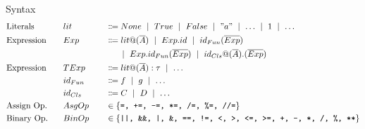 \documentclass[11pt]{jarticle}
\begin{document}
Syntax
\begin{alignat*}{3} %
  &\text{Literals} &&lit &&\Coloneqq None ~\mid~ True ~\mid~ False ~\mid~ "a" ~\mid~ \dots ~\mid~ 1 ~\mid~ \dots\\
  &\text{Expression}~~~ &&Exp &&\Coloneqq lit@(\overline{A}) ~\mid~ Exp.id  ~\mid~ id_{Fun}(\overline{Exp})\\
  &&&&&~~~~~\mid~ Exp.id_{Fun}(\overline{Exp}) ~\mid~ id_{Cls}@(\overline{A}).(\overline{Exp})\\
  &\text{Expression}~~~ &&TExp &&\Coloneqq lit@(\overline{A}):\tau ~\mid~ \dots\\
  &&&id_{Fun} &&\Coloneqq f ~\mid~ g ~\mid~ \dots\\
  &&&id_{Cls} &&\Coloneqq C ~\mid~ D ~\mid~ \dots\\
  &\text{Assign Op.} &&AsgOp~~~ &&\in \{\texttt{=, +=, -=, *=, /=, \%=, //=}\}\\
  &\text{Binary Op.} &&BinOp &&\in \{\texttt{||, \&\&, |, \&, ==, !=, <, >, <=, >=, +, -, *, /, \%, **}\}
\end{alignat*}
\end{document}
